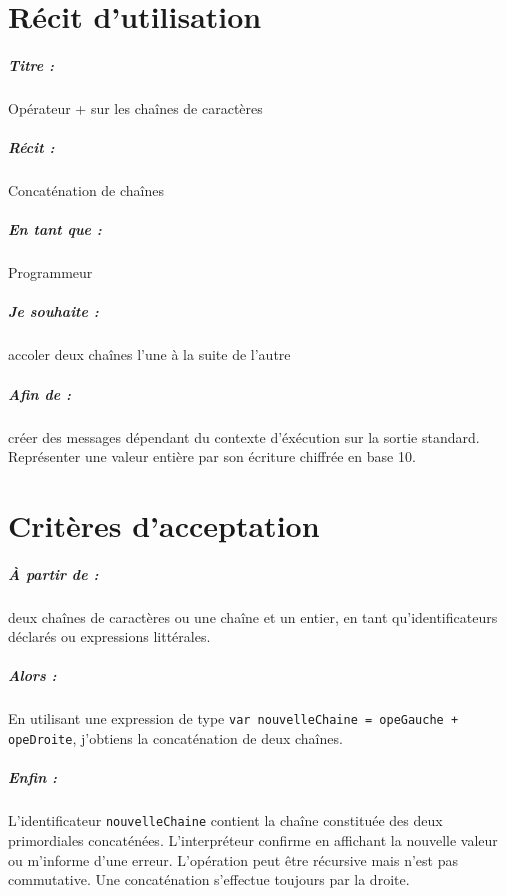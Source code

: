 \documentclass[12pt,a5paper, notitle, oneside]{report}
\begin{document}
    \chapter*{Récit d'utilisation}

    \paragraph{Titre : } Opérateur + sur les chaînes de caractères
    \paragraph{Récit : } Concaténation de chaînes
    \paragraph{En tant que : } Programmeur
    \paragraph{Je souhaite : } accoler deux chaînes l'une à la suite de l'autre
    \paragraph{Afin de : } créer des messages dépendant du contexte d'éxécution sur
    la sortie standard. Représenter une valeur entière par son écriture chiffrée en
    base 10.
    \newpage

    \chapter*{Critères d'acceptation}

    \paragraph{À partir de : } deux chaînes de caractères ou une chaîne et un entier,
    en tant qu'identificateurs déclarés ou expressions littérales.

    \paragraph{Alors : } En utilisant une expression de type
    \verb|var nouvelleChaine = opeGauche + opeDroite|, j'obtiens la concaténation de
    deux chaînes.

    \paragraph{Enfin : } L'identificateur \verb|nouvelleChaine| contient la chaîne
    constituée des deux primordiales concaténées. L'interpréteur confirme en affichant
    la nouvelle valeur ou m'informe d'une erreur. L'opération peut être récursive mais n'est pas commutative. Une concaténation s'effectue toujours par la droite.
\end{document}
